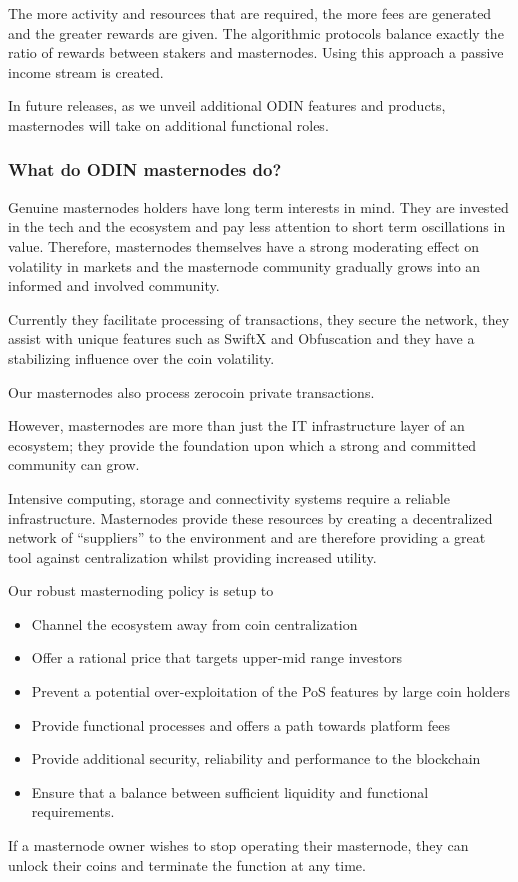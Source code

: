 \documentclass[12pt,letterpaper]{article}
\begin{document}
The more activity and resources that are required, the more fees are generated and the greater rewards are given. The algorithmic protocols balance exactly the ratio of rewards between stakers and masternodes. Using this approach a passive income stream is created.

In future releases, as we unveil additional ODIN features and products, masternodes will take on additional functional roles.

\subsubsection{What do ODIN masternodes do?}
Genuine masternodes holders have long term interests in mind. They are invested in the tech and the ecosystem and pay less attention to short term oscillations in value.  Therefore, masternodes themselves have a strong moderating effect on volatility in markets and the masternode community gradually grows into an informed and involved community. 

Currently they facilitate processing of transactions, they secure the network, they assist with unique features such as SwiftX and Obfuscation and they have a stabilizing influence over the coin volatility. 

Our masternodes also process zerocoin private transactions.

However, masternodes are more than just the IT infrastructure layer of an ecosystem; they provide the foundation upon which a strong and committed community can grow.

Intensive computing, storage and connectivity systems require a reliable infrastructure.  Masternodes provide these resources by creating a decentralized network of ``suppliers'' to the environment and are therefore providing a great tool against centralization whilst providing increased utility.

Our robust masternoding policy is setup to
\begin{itemize}
   \item Channel the ecosystem away from coin centralization 
   \item Offer a rational price that targets upper-mid range investors
   \item Prevent a potential over-exploitation of the PoS features by large coin holders
   \item Provide functional processes and offers a path towards platform fees
   \item Provide additional security, reliability and performance to the blockchain
   \item Ensure that a balance between sufficient liquidity and functional requirements.
\end{itemize}
If a masternode owner wishes to stop operating their masternode, they can unlock their coins and terminate the function at any time.
\end{document}
